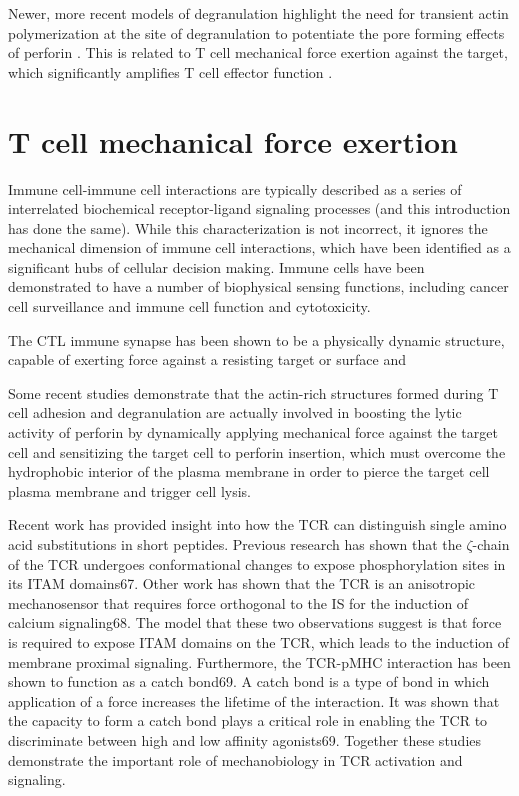 Newer, more recent models of degranulation highlight the need for transient actin polymerization at the site of degranulation to potentiate the pore forming effects of perforin \cite{Tamzalit2018}. This is related to T cell mechanical force exertion against the target, which significantly amplifies T cell effector function \cite{Tamzalit2018}.

\section{T cell mechanical force exertion}
Immune cell-immune cell interactions are typically described as a series of interrelated biochemical receptor-ligand signaling processes (and this introduction has done the same). While this characterization is not incorrect, it ignores the mechanical dimension of immune cell interactions, which have been identified as a significant hubs of cellular decision making. Immune cells have been demonstrated to have a number of biophysical sensing functions, including cancer cell surveillance and immune cell function and cytotoxicity.

The CTL immune synapse has been shown to be a physically dynamic structure, capable of exerting force against a resisting target or surface and 

Some recent studies demonstrate that the actin-rich structures formed during T cell adhesion and degranulation are actually involved in boosting the lytic activity of perforin by dynamically applying mechanical force against the target cell \cite{Basu2016, Tamzalit2018} and sensitizing the target cell to perforin insertion, which must overcome the hydrophobic interior of the plasma membrane in order to pierce the target cell plasma membrane and trigger cell lysis.

Recent work has provided insight into how the TCR can distinguish
single amino acid substitutions in short peptides. Previous research has
shown that the $\zeta$-chain of the TCR undergoes conformational changes to
expose phosphorylation sites in its ITAM domains67. Other work has shown
that the TCR is an anisotropic mechanosensor that requires force orthogonal
to the IS for the induction of calcium signaling68. The model that these two
observations suggest is that force is required to expose ITAM domains on the
TCR, which leads to the induction of membrane proximal signaling.
Furthermore, the TCR-pMHC interaction has been shown to function as a
catch bond69. A catch bond is a type of bond in which application of a force
increases the lifetime of the interaction. It was shown that the capacity to form
a catch bond plays a critical role in enabling the TCR to discriminate between
high and low affinity agonists69. Together these studies demonstrate the
important role of mechanobiology in TCR activation and signaling.

